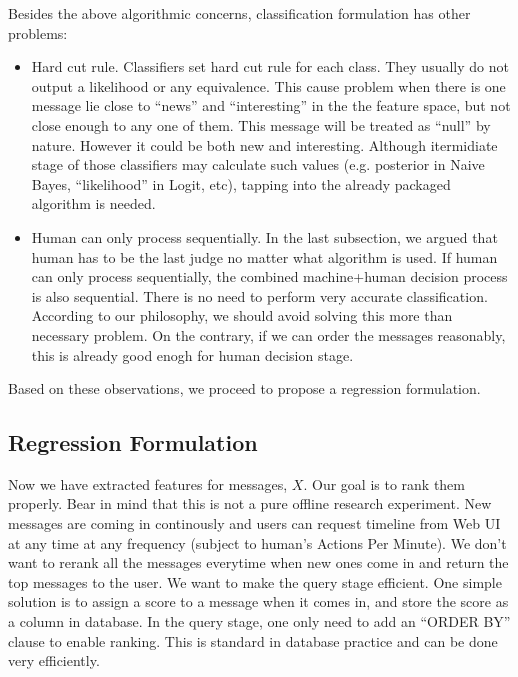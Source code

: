 \documentclass{sig-alternate}
\begin{document}
Besides the above algorithmic concerns,
classification formulation has other problems:

\begin{itemize}
	\item Hard cut rule. 
		Classifiers set hard cut rule for each class. 
		They usually do not output a likelihood or any equivalence.
		This cause problem when there is one message lie close to 
		``news'' and ``interesting'' in the the feature space, 
		but not close enough to any one of them. 
		This message will be treated as ``null'' by nature. 
		However it could be both new and interesting. 
		Although itermidiate stage of those classifiers may calculate 
		such values (e.g. posterior in Naive Bayes, ``likelihood'' in Logit, etc), 
		tapping into the already packaged algorithm is needed. 
	\item Human can only process sequentially. 
		In the last subsection, we argued that human has to be the 
		last judge no matter what algorithm is used. 
		If human can only process sequentially, 
		the combined machine+human decision process is also sequential. 
		There is no need to perform very accurate classification.
		According to our philosophy, 
		we should avoid solving this more than necessary problem. 
		On the contrary, if we can order the messages reasonably, 
		this is already good enogh for human decision stage. 
\end{itemize}

Based on these observations, we proceed to propose a regression formulation. 

\subsection{Regression Formulation}
\label{sec:Regression Formulation}

Now we have extracted features for messages, $X$. 
Our goal is to rank them properly. 
Bear in mind that this is not a pure offline research experiment. 
New messages are coming in continously and 
users can request timeline from Web UI at any time at any frequency
(subject to human's Actions Per Minute). 
We don't want to rerank all the messages 
everytime when new ones come in and
return the top messages to the user. 
We want to make the query stage efficient. 
One simple solution is to assign a score to a message when it comes in, 
and store the score as a column in database. 
In the query stage, one only need to add an ``ORDER BY'' clause to enable ranking. 
This is standard in database practice and can be done very efficiently. 
\end{document}
